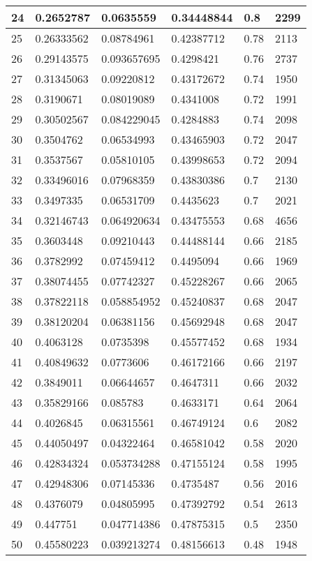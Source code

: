 \begin{longtable}{|l|l|l|l|l|l|}
24 & 0.2652787 & 0.0635559 & 0.34448844 & 0.8 & 2299 \\ \hline 
25 & 0.26333562 & 0.08784961 & 0.42387712 & 0.78 & 2113 \\ \hline 
26 & 0.29143575 & 0.093657695 & 0.4298421 & 0.76 & 2737 \\ \hline 
27 & 0.31345063 & 0.09220812 & 0.43172672 & 0.74 & 1950 \\ \hline 
28 & 0.3190671 & 0.08019089 & 0.4341008 & 0.72 & 1991 \\ \hline 
29 & 0.30502567 & 0.084229045 & 0.4284883 & 0.74 & 2098 \\ \hline 
30 & 0.3504762 & 0.06534993 & 0.43465903 & 0.72 & 2047 \\ \hline 
31 & 0.3537567 & 0.05810105 & 0.43998653 & 0.72 & 2094 \\ \hline 
32 & 0.33496016 & 0.07968359 & 0.43830386 & 0.7 & 2130 \\ \hline 
33 & 0.3497335 & 0.06531709 & 0.4435623 & 0.7 & 2021 \\ \hline 
34 & 0.32146743 & 0.064920634 & 0.43475553 & 0.68 & 4656 \\ \hline 
35 & 0.3603448 & 0.09210443 & 0.44488144 & 0.66 & 2185 \\ \hline 
36 & 0.3782992 & 0.07459412 & 0.4495094 & 0.66 & 1969 \\ \hline 
37 & 0.38074455 & 0.07742327 & 0.45228267 & 0.66 & 2065 \\ \hline 
38 & 0.37822118 & 0.058854952 & 0.45240837 & 0.68 & 2047 \\ \hline 
39 & 0.38120204 & 0.06381156 & 0.45692948 & 0.68 & 2047 \\ \hline 
40 & 0.4063128 & 0.0735398 & 0.45577452 & 0.68 & 1934 \\ \hline 
41 & 0.40849632 & 0.0773606 & 0.46172166 & 0.66 & 2197 \\ \hline 
42 & 0.3849011 & 0.06644657 & 0.4647311 & 0.66 & 2032 \\ \hline 
43 & 0.35829166 & 0.085783 & 0.4633171 & 0.64 & 2064 \\ \hline 
44 & 0.4026845 & 0.06315561 & 0.46749124 & 0.6 & 2082 \\ \hline 
45 & 0.44050497 & 0.04322464 & 0.46581042 & 0.58 & 2020 \\ \hline 
46 & 0.42834324 & 0.053734288 & 0.47155124 & 0.58 & 1995 \\ \hline 
47 & 0.42948306 & 0.07145336 & 0.4735487 & 0.56 & 2016 \\ \hline 
48 & 0.4376079 & 0.04805995 & 0.47392792 & 0.54 & 2613 \\ \hline 
49 & 0.447751 & 0.047714386 & 0.47875315 & 0.5 & 2350 \\ \hline 
50 & 0.45580223 & 0.039213274 & 0.48156613 & 0.48 & 1948 \\ \hline 
\end{longtable}